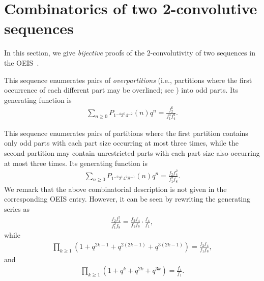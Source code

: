 \documentclass[12pt,reqno]{amsart}
\numberwithin{equation}{section}
\theoremstyle{plain}
\theoremstyle{definition}
\newtheorem{remark}[theorem]{Remark}
\theoremstyle{named}
\begin{document}
\section{Combinatorics of two 2-convolutive sequences}\label{sec:2cons}

In this section, we give \emph{bijective} proofs of the $2$-convolutivity of two sequences in the OEIS~\cite{OEIS}.
\begin{description}[itemsep=2pt]
	\item[A007096] This sequence enumerates pairs of \emph{overpartitions} (i.e., partitions where the first occurrence of each different part may be overlined; see \cite{CL2004}) into odd parts. Its generating function is
	\begin{align*}
		\sum_{n\ge 0} P_{1^{-4} 2^6 4^{-2}}(n) q^n = \frac{f_2^6}{f_1^4 f_4^2}.
	\end{align*}
	
	\item[A103258] This sequence enumerates pairs of partitions where the first partition contains only odd parts with each part size occurring at most three times, while the second partition may contain unrestricted parts with each part size also occurring at most three times. Its generating function is
	\begin{align*}
		\sum_{n\ge 0} P_{1^{-2} 2^1 4^{2} 8^{-1}}(n) q^n = \frac{f_2 f_4^2}{f_1^2 f_8}.
	\end{align*}
    We remark that the above combinatorial description is not given in the corresponding OEIS entry. However, it can be seen by rewriting the generating series as
    \begin{align*}
        \frac{f_2 f_4^2}{f_1^2 f_8} = \frac{f_2f_4}{f_1f_8}\cdot \frac{f_4}{f_1},
    \end{align*}
    while
    \begin{align*}
		\prod_{k\ge 1} (1+q^{2k-1}+q^{2(2k-1)}+q^{3(2k-1)}) = \frac{f_2f_4}{f_1f_8},
	\end{align*}
	and
	\begin{align*}
		\prod_{k\ge 1} (1+q^{k}+q^{2k}+q^{3k}) = \frac{f_4}{f_1}.
	\end{align*}
\end{description}

\end{document}

